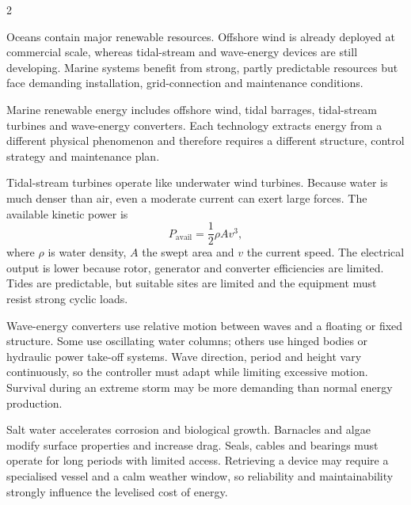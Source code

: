 

\begin{multicols}{2}
\begin{engineeringnews}
Oceans contain major renewable resources. Offshore wind is already deployed at commercial scale,
whereas tidal-stream and wave-energy devices are still developing. Marine systems benefit from strong,
partly predictable resources but face demanding installation, grid-connection and maintenance conditions.
\end{engineeringnews}

\begin{ecarticle}
Marine renewable energy includes offshore wind, tidal barrages, tidal-stream turbines and wave-energy
converters. Each technology extracts energy from a different physical phenomenon and therefore requires
a different structure, control strategy and maintenance plan.

Tidal-stream turbines operate like underwater wind turbines. Because water is much denser than air,
even a moderate current can exert large forces. The available kinetic power is
\[
P_{\mathrm{avail}}=\frac{1}{2}\rho A v^3,
\]
where $\rho$ is water density, $A$ the swept area and $v$ the current speed. The electrical output is
lower because rotor, generator and converter efficiencies are limited. Tides are predictable, but
suitable sites are limited and the equipment must resist strong cyclic loads.

Wave-energy converters use relative motion between waves and a floating or fixed structure. Some use
oscillating water columns; others use hinged bodies or hydraulic power take-off systems. Wave direction,
period and height vary continuously, so the controller must adapt while limiting excessive motion.
Survival during an extreme storm may be more demanding than normal energy production.

Salt water accelerates corrosion and biological growth. Barnacles and algae modify surface properties
and increase drag. Seals, cables and bearings must operate for long periods with limited access.
Retrieving a device may require a specialised vessel and a calm weather window, so reliability and
maintainability strongly influence the levelised cost of energy.


\end{ecarticle}
\end{multicols}
